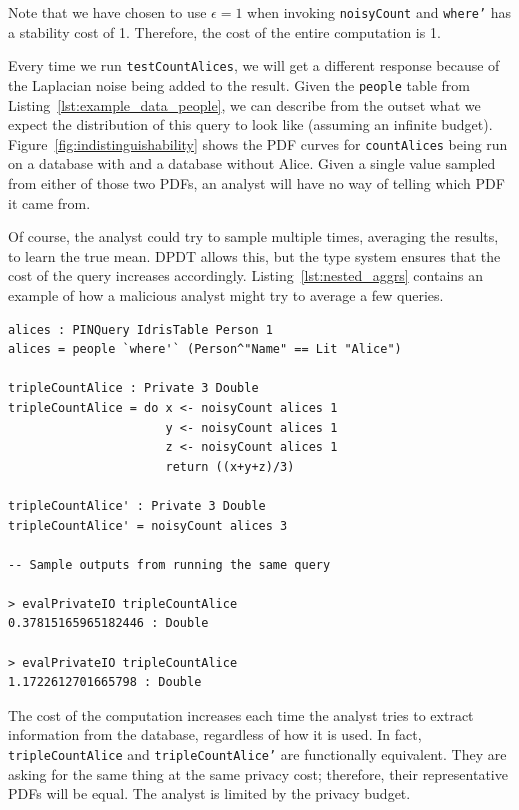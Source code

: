 \documentclass[12pt]{report}
\begin{document}
Note that we have chosen to use $\epsilon = 1$ when invoking \texttt{noisyCount} and \texttt{where'} has a stability cost of 1.
Therefore, the cost of the entire computation is 1.

Every time we run \texttt{testCountAlices}, we will get a different response because of the Laplacian noise being added to the result.
Given the \texttt{people} table from Listing~\ref{lst:example_data_people}, we can describe from the outset what we expect the distribution of this query to look like (assuming an infinite budget).
Figure~\ref{fig:indistinguishability} shows the PDF curves for \texttt{countAlices} being run on a database with and a database without Alice.
Given a single value sampled from either of those two PDFs, an analyst will have no way of telling which PDF it came from.

Of course, the analyst could try to sample multiple times, averaging the results, to learn the true mean.
DPDT allows this, but the type system ensures that the cost of the query increases accordingly.
Listing~\ref{lst:nested_aggrs} contains an example of how a malicious analyst might try to average a few queries.

\begin{lstlisting}[float,caption={Counting Alices (revisited)},label={lst:nested_aggrs}]
alices : PINQuery IdrisTable Person 1
alices = people `where'` (Person^"Name" == Lit "Alice")

tripleCountAlice : Private 3 Double
tripleCountAlice = do x <- noisyCount alices 1
                      y <- noisyCount alices 1
                      z <- noisyCount alices 1
                      return ((x+y+z)/3)

tripleCountAlice' : Private 3 Double
tripleCountAlice' = noisyCount alices 3

-- Sample outputs from running the same query

> evalPrivateIO tripleCountAlice
0.37815165965182446 : Double

> evalPrivateIO tripleCountAlice
1.1722612701665798 : Double
\end{lstlisting}

The cost of the computation increases each time the analyst tries to extract information from the database, regardless of how it is used.
In fact, \texttt{tripleCountAlice} and \texttt{tripleCountAlice'} are functionally equivalent.
They are asking for the same thing at the same privacy cost; therefore, their representative PDFs will be equal.
The analyst is limited by the privacy budget.
\end{document}

